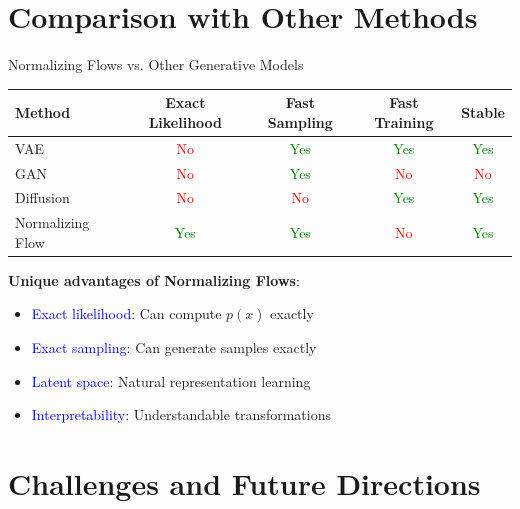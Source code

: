 \documentclass[aspectratio=169]{beamer}
\begin{document}
\section{Comparison with Other Methods}

\begin{frame}{Normalizing Flows vs. Other Generative Models}
\begin{table}
\centering
\begin{tabular}{|l|c|c|c|c|}
\hline
Method & Exact Likelihood & Fast Sampling & Fast Training & Stable \\
\hline
VAE & \textcolor{red}{No} & \textcolor{green}{Yes} & \textcolor{green}{Yes} & \textcolor{green}{Yes} \\
GAN & \textcolor{red}{No} & \textcolor{green}{Yes} & \textcolor{red}{No} & \textcolor{red}{No} \\
Diffusion & \textcolor{red}{No} & \textcolor{red}{No} & \textcolor{green}{Yes} & \textcolor{green}{Yes} \\
Normalizing Flow & \textcolor{green}{Yes} & \textcolor{green}{Yes} & \textcolor{red}{No} & \textcolor{green}{Yes} \\
\hline
\end{tabular}
\end{table}

\textbf{Unique advantages of Normalizing Flows}:
\begin{itemize}
    \item \textcolor{blue}{Exact likelihood}: Can compute $p(x)$ exactly
    \item \textcolor{blue}{Exact sampling}: Can generate samples exactly
    \item \textcolor{blue}{Latent space}: Natural representation learning
    \item \textcolor{blue}{Interpretability}: Understandable transformations
\end{itemize}
\end{frame}

\section{Challenges and Future Directions}
\end{document}
